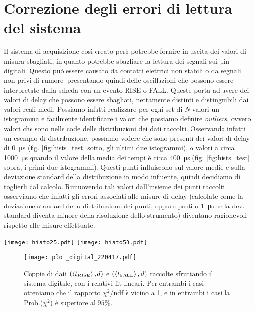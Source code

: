 \documentclass[
    rmp,
    reprint, 
    superscriptaddress, 
    altaffilletter, 
    amsmath, 
    amssymb, 
    a4paper,
    varvw]{revtex4-2}
\begin{document}
\section{Correzione degli errori di lettura del sistema}
Il sistema di acquisizione così creato però potrebbe fornire in uscita dei valori di misura sbagliati, in quanto potrebbe sbagliare la lettura dei segnali sui pin digitali. Questo può essere causato da contatti elettrici non stabili o da segnali non privi di rumore, presentando quindi delle oscillazioni che possono essere interpretate dalla scheda con un evento RISE o FALL. Questo porta ad avere dei valori di delay che possono essere sbagliati, nettamente distinti e distinguibili dai valori reali medi. Possiamo infatti realizzare per ogni set di $N$ valori un istogramma e facilmente identificare i valori che possiamo definire \emph{outliers}, ovvero valori che sono nelle code delle distribuzioni dei dati raccolti. Osservando infatti un esempio di distribuzione, possiamo vedere che sono presenti dei valori di delay di \SI{0}{\micro\second} (fig. \ref{fig:hists_test} sotto, gli ultimi due istogrammi), o valori a circa \SI{1000}{\micro\second} quando il valore della media dei tempi è circa \SI{400}{\micro\second} (fig. \ref{fig:hists_test} sopra, i primi due istogrammi).
Questi punti influiscono sul valore medio e sulla deviazione standard della distribuzione in modo influente, quindi decidiamo di toglierli dal calcolo. Rimuovendo tali valori dall'insieme dei punti raccolti osserviamo che infatti gli errori associati alle misure di delay (calcolate come la deviazione standard della distribuzione dei punti, oppure posti a \SI{1}{\micro\second} se la dev. standard diventa minore della risoluzione dello strumento) diventano ragionevoli rispetto alle misure effettuate. 

\begin{figure*}
    \texttt{[image: histo25.pdf]}
    \texttt{[image: histo50.pdf]}
    \caption{Istogrammi dei set di dati raccolti (sono riportati quelli per le misure a \SI{0.25}{\metre} e quelle per le misure a \SI{0.5}{\metre}). Per ogni distanza sono raccolti $N=50$ punti, sia per l'evento RISE che per l'evento FALL, in due istanti differenti, un per il primo fronte di variazione del segnale fornito dal microfono, uno per il secondo fronte. La media tra queste due misure permette di ottenere poi una misura più precisa dell'effettivo fronte d'onda che viene rilevato dal microfono. }\label{fig:hists_test}
\end{figure*}
\begin{figure}[!t]
    \centering
    \texttt{[image: plot\_digital\_220417.pdf]}
    \caption{Coppie di dati $(\expval{t_\text{RISE}}, d)$ e $(\expval{t_\text{FALL}}, d)$ raccolte sfruttando il sistema digitale, con i relativi fit lineari. Per entrambi i casi otteniamo che il rapporto $\chi^2/\text{ndf}$ è vicino a 1, e in entrambi i casi la Prob.($\chi^2$) è superiore al $95\%$.}\label{fig:digital_plot_d2}
\end{figure}
\end{document}
